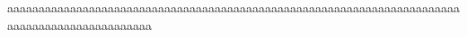 \documentclass{article}
\begin{document}
aaaaaaaaaaaaaaaaaaaaaaaaaaaaaaaaaaaaaaaaaaaaaaaaaaaaaaaaaaaaaaaaaaaaaaaaaaaaaaaaaaaaaaaaaaaaaaa
\end{document}
